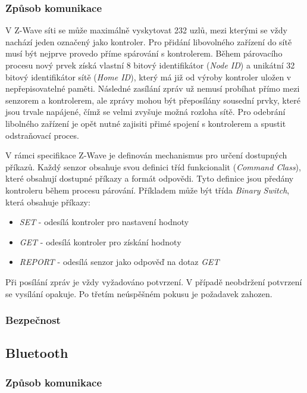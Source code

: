  \subsubsection{Způsob komunikace}
 V Z-Wave síti se může maximálně vyskytovat 232 uzlů, mezi kterými se vždy nachází jeden označený
 jako kontroler. Pro přidání libovolného zařízení do sítě musí být nejprve provedo příme spárování
 s kontrolerem. Během párovacího procesu nový prvek získá vlastní 8 bitový identifikátor (\textit{Node ID}) a 
 unikátní 32 bitový identifikátor sítě (\textit{Home ID}), který má již od výroby kontroler uložen v nepřepisovatelné paměti.
 Následné zasílání zpráv už nemusí probíhat přímo mezi senzorem a kontrolerem, ale zprávy mohou
 být přeposílány sousední prvky, které jsou trvale napájené, čímž se velmi zvyšuje možná rozloha sítě. 
 Pro odebrání libolného zařízení je opět nutné zajisiti přimé spojení s kontrolerem a spustit odstraňovací
 proces. 
 
 V rámci specifikace Z-Wave je definován mechanismus pro určení dostupných příkazů. Každý senzor obsahuje
 svou definici tříd funkcionalit (\textit{Command Class}), které obsahují dostupné příkazy a formát odpovědi. Tyto definice
 jsou předány kontroleru během procesu párování. Příkladem může být třída \textit{Binary Switch}, která obsahuje příkazy:
 \begin{itemize}
 \item \textit{SET} - odesílá kontroler pro nastavení hodnoty 
 \item \textit{GET} - odesílá kontroler pro získání hodnoty  
 \item \textit{REPORT} - odesílá senzor jako odpověď na dotaz \textit{GET} 
 \end{itemize}
 
 Při posílání zpráv je vždy vyžadováno potvrzení. V případě neobdržení potvrzení se vysílání opakuje. 
 Po třetím neúspěšném pokusu je požadavek zahozen.
 
 \subsubsection{Bezpečnost}
 
  \subsection{Bluetooth}
  \subsubsection{Způsob komunikace}
 
